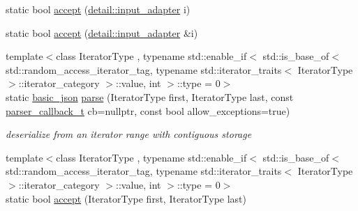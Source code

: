 \begin{DoxyCompactItemize}
static bool \hyperlink{classnlohmann_1_1basic__json_a776868dd5f9892564c1f6c786d1f80a3}{accept} (\hyperlink{classnlohmann_1_1detail_1_1input__adapter}{detail\+::input\+\_\+adapter} i)
\item 
static bool \hyperlink{classnlohmann_1_1basic__json_a2c3a529fba80aa83557246b910181388}{accept} (\hyperlink{classnlohmann_1_1detail_1_1input__adapter}{detail\+::input\+\_\+adapter} \&i)
\item 
{\footnotesize template$<$class Iterator\+Type , typename std\+::enable\+\_\+if$<$ std\+::is\+\_\+base\+\_\+of$<$ std\+::random\+\_\+access\+\_\+iterator\+\_\+tag, typename std\+::iterator\+\_\+traits$<$ Iterator\+Type $>$\+::iterator\+\_\+category $>$\+::value, int $>$\+::type  = 0$>$ }\\static \hyperlink{classnlohmann_1_1basic__json}{basic\+\_\+json} \hyperlink{classnlohmann_1_1basic__json_ab330c13ba254ea41fbc1c52c5c610f45}{parse} (Iterator\+Type first, Iterator\+Type last, const \hyperlink{classnlohmann_1_1basic__json_ab4f78c5f9fd25172eeec84482e03f5b7}{parser\+\_\+callback\+\_\+t} cb=nullptr, const bool allow\+\_\+exceptions=true)
\begin{DoxyCompactList}\small\item\em deserialize from an iterator range with contiguous storage \end{DoxyCompactList}\item 
{\footnotesize template$<$class Iterator\+Type , typename std\+::enable\+\_\+if$<$ std\+::is\+\_\+base\+\_\+of$<$ std\+::random\+\_\+access\+\_\+iterator\+\_\+tag, typename std\+::iterator\+\_\+traits$<$ Iterator\+Type $>$\+::iterator\+\_\+category $>$\+::value, int $>$\+::type  = 0$>$ }\\static bool \hyperlink{classnlohmann_1_1basic__json_ae797958b922732bf5fc01053d0659c1f}{accept} (Iterator\+Type first, Iterator\+Type last)
\end{DoxyCompactItemize}

